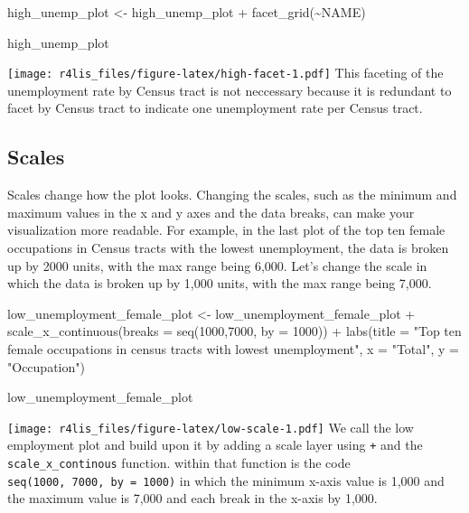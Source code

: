 \documentclass[
  krantz2]{krantz}
\makeatletter
\newenvironment{Shaded}{\begin{snugshade}}{\end{snugshade}}
\newcommand{\AttributeTok}[1]{\textcolor[rgb]{0.61,0.61,0.61}{#1}}
\newcommand{\DecValTok}[1]{\textcolor[rgb]{0.06,0.06,0.06}{#1}}
\newcommand{\FunctionTok}[1]{\textcolor[rgb]{0,0,0}{#1}}
\newcommand{\NormalTok}[1]{#1}
\newcommand{\OtherTok}[1]{\textcolor[rgb]{0.37,0.37,0.37}{#1}}
\newcommand{\SpecialCharTok}[1]{\textcolor[rgb]{0,0,0}{#1}}
\newcommand{\StringTok}[1]{\textcolor[rgb]{0.5,0.5,0.5}{#1}}
\newenvironment{kframe}{%
\medskip{}
\setlength{\fboxsep}{.8em}
 \def\at@end@of@kframe{}%
 \ifinner\ifhmode%
  \def\at@end@of@kframe{\end{minipage}}%
  \begin{minipage}{\columnwidth}%
 \fi\fi%
 \def\FrameCommand##1{\hskip\@totalleftmargin \hskip-\fboxsep
 \colorbox{shadecolor}{##1}\hskip-\fboxsep
     \hskip-\linewidth \hskip-\@totalleftmargin \hskip\columnwidth}%
 \MakeFramed {\advance\hsize-\width
   \@totalleftmargin\z@ \linewidth\hsize
   \@setminipage}}%
 {\par\unskip\endMakeFramed%
 \at@end@of@kframe}
\renewenvironment{Shaded}{\begin{kframe}}{\end{kframe}}
\makeatother
\begin{document}
\begin{Shaded}
\begin{Highlighting}[]
\NormalTok{high\_unemp\_plot }\OtherTok{\textless{}{-}}\NormalTok{ high\_unemp\_plot }\SpecialCharTok{+}
  \FunctionTok{facet\_grid}\NormalTok{(}\SpecialCharTok{\textasciitilde{}}\NormalTok{NAME)}

\NormalTok{high\_unemp\_plot}
\end{Highlighting}
\end{Shaded}

\texttt{[image: r4lis\_files/figure-latex/high-facet-1.pdf]}
This faceting of the unemployment rate by Census tract is not neccessary because it is redundant to facet by Census tract to indicate one unemployment rate per Census tract.

\hypertarget{scales}{%
\subsection{Scales}\label{scales}}

Scales change how the plot looks. Changing the scales, such as the minimum and maximum values in the x and y axes and the data breaks, can make your visualization more readable. For example, in the last plot of the top ten female occupations in Census tracts with the lowest unemployment, the data is broken up by 2000 units, with the max range being 6,000. Let's change the scale in which the data is broken up by 1,000 units, with the max range being 7,000.

\begin{Shaded}
\begin{Highlighting}[]
\NormalTok{low\_unemployment\_female\_plot }\OtherTok{\textless{}{-}}\NormalTok{ low\_unemployment\_female\_plot }\SpecialCharTok{+}
  \FunctionTok{scale\_x\_continuous}\NormalTok{(}\AttributeTok{breaks =} \FunctionTok{seq}\NormalTok{(}\DecValTok{1000}\NormalTok{,}\DecValTok{7000}\NormalTok{, }\AttributeTok{by =} \DecValTok{1000}\NormalTok{)) }\SpecialCharTok{+}
  \FunctionTok{labs}\NormalTok{(}\AttributeTok{title =} \StringTok{"Top ten female occupations in census tracts with lowest unemployment"}\NormalTok{,}
       \AttributeTok{x =} \StringTok{"Total"}\NormalTok{, }\AttributeTok{y =} \StringTok{"Occupation"}\NormalTok{)}

\NormalTok{low\_unemployment\_female\_plot}
\end{Highlighting}
\end{Shaded}

\texttt{[image: r4lis\_files/figure-latex/low-scale-1.pdf]}
We call the low employment plot and build upon it by adding a scale layer using \texttt{+} and the \texttt{scale\_x\_continous} function. within that function is the code \texttt{seq(1000,\ 7000,\ by\ =\ 1000)} in which the minimum x-axis value is 1,000 and the maximum value is 7,000 and each break in the x-axis by 1,000.
\end{document}
